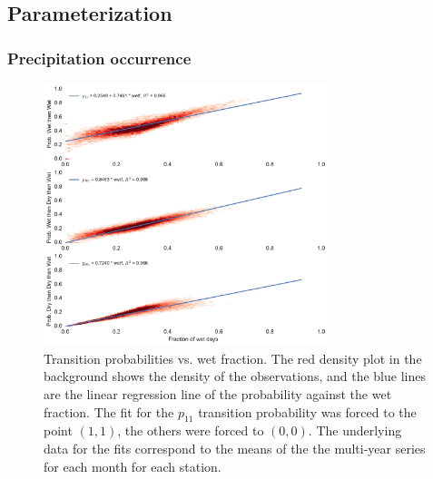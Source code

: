 \begin{refsection}
\subsection{Parameterization} \label{sec:param}

\subsubsection{Precipitation occurrence} \label{sec:markov}

\begin{figure}
	\includegraphics[width=8.3cm]{gwgen-figures/f03.pdf}
	\caption[Transition probabilities vs. wet fraction]{Transition probabilities vs. wet fraction. The red density plot in the background shows the density of the observations, and the blue lines are the linear regression line of the probability against the wet fraction. The fit for the $p_{11}$ transition probability was forced to the point $(1, 1)$, the others were forced to $(0, 0)$. The underlying data for the fits correspond to the means of the the multi-year series for each month for each station.}
	\label{fig:markov}
\end{figure}


\end{refsection}
